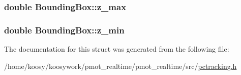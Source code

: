 \hypertarget{struct_bounding_box_a8844edaf778f133c4c932ea704d2b763}{
\subsubsection[{z\-\_\-max}]{\setlength{\rightskip}{0pt plus 5cm}double {\bf \-Bounding\-Box\-::z\-\_\-max}}}\label{struct_bounding_box_a8844edaf778f133c4c932ea704d2b763}
\hypertarget{struct_bounding_box_a8ff621230389e0ffd6d82db867cc96e6}{
\subsubsection[{z\-\_\-min}]{\setlength{\rightskip}{0pt plus 5cm}double {\bf \-Bounding\-Box\-::z\-\_\-min}}}\label{struct_bounding_box_a8ff621230389e0ffd6d82db867cc96e6}


\-The documentation for this struct was generated from the following file\-:\begin{DoxyCompactItemize}
\item 
/home/koosy/koosywork/pmot\-\_\-realtime/pmot\-\_\-realtime/src/\hyperlink{pctracking_8h}{pctracking.\-h}\end{DoxyCompactItemize}

